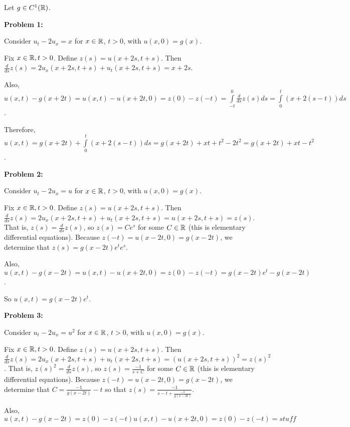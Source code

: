 \documentclass[a4paper,12pt]{article}
\begin{document}
Let $g \in C^1(\mathbb{R})$. 

{\bf Problem 1:} %

Consider $u_t -2u_x = x$ for $x \in \mathbb{R}$, $t >0$, with $u(x,0) = g(x)$.

Fix $x \in \mathbb{R}, t >0$. Define $z(s) = u(x+2s,t+s)$. Then $\frac{d}{ds}z(s) = 2u_x(x+2s,t+s) + u_t(x+2s,t+s) = x+2s$.

Also, $u(x,t) - g(x+2t) = u(x,t) - u(x+2t,0) = z(0) - z(-t) = \int\limits_{-t}^0 \frac{d}{ds}z(s) ds = \int\limits_0^t (x+2(s-t))ds$. %

Therefore, $u(x,t) = g(x+2t) + \int\limits_0^t (x+2(s-t))ds = g(x+2t) + xt + t^2 -2t^2 =g(x+2t) + xt - t^2$.

\shunt

{\bf Problem 2:}

Consider $u_t -2u_x = u$ for $x \in \mathbb{R}$, $t >0$, with $u(x,0) = g(x)$.

Fix $x \in \mathbb{R}, t >0$. Define $z(s) = u(x+2s,t+s)$. Then $\frac{d}{ds}z(s) = 2u_x(x+2s,t+s) + u_t(x+2s,t+s) = u(x+2s,t+s)=z(s)$. That is, $z(s) = \frac{d}{ds}z(s)$, so $z(s) = Ce^s$ for some $C \in \mathbb{R}$ (this is elementary differential equations). Because $z(-t) = u(x-2t,0)=g(x-2t)$, we determine that $z(s) = g(x-2t)e^te^s$. 

Also, $u(x,t) - g(x-2t)  = u(x,t) - u(x+2t,0) = z(0) - z(-t) = g(x-2t)e^t -g(x-2t)$.

So $u(x,t) = g(x-2t)e^t$.

\shunt

{\bf Problem 3:}

Consider $u_t -2u_x = u^2$ for $x \in \mathbb{R}$, $t >0$, with $u(x,0) = g(x)$.

Fix $x \in \mathbb{R}, t >0$. Define $z(s) = u(x+2s,t+s)$. Then $\frac{d}{ds}z(s) = 2u_x(x+2s,t+s) + u_t(x+2s,t+s) = (u(x+2s,t+s))^2=z(s)^2$. That is, $z(s)^2 = \frac{d}{ds}z(s)$, so $z(s) = \frac{-1}{s+C}$ for some $C \in \mathbb{R}$ (this is elementary differential equations). Because $z(-t) = u(x-2t,0)=g(x-2t)$, we determine that $C= \frac{-1}{g(x-2t)} -t$ so that $z(s) = \frac{-1}{s-t+\frac{-1}{g(x-2t)}}$.

Also, $u(x,t) - g(x-2t) = z(0) - z(-t)u(x,t) - u(x+2t,0) = z(0) - z(-t) =stuff$ %

\shunt
\end{document}
